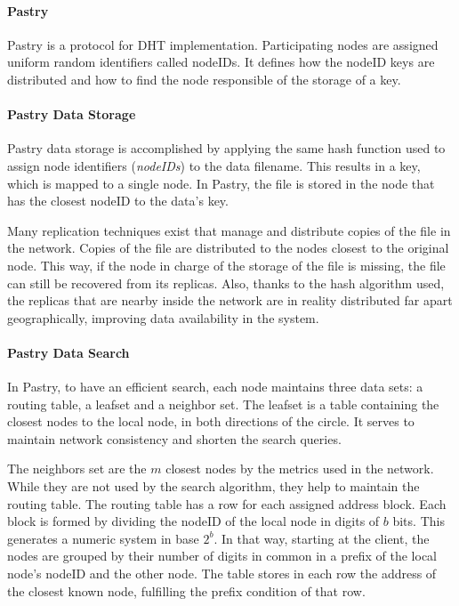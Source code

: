 \paragraph{Pastry}
\label{sec:pastry}
Pastry is a protocol for DHT implementation. Participating nodes are assigned
uniform random identifiers called nodeIDs. It defines how the nodeID keys 
are distributed and how to find the node responsible of the storage of a key.

\paragraph{Pastry Data Storage}

Pastry data storage is accomplished by applying the same hash function used to assign node
identifiers (\textit{nodeIDs}) to the data filename. This results in a key, which is
mapped to a single node. In Pastry, the file is stored in the node that has the closest nodeID
to the data's key.

Many replication techniques exist that manage and distribute copies of the file
in the network. 
Copies of the file are distributed to the nodes closest
to the original node. This way, if the node in charge of the storage of the file
is missing, the file can still be recovered from its replicas. Also, thanks
to the hash algorithm used, the replicas that are nearby inside the network are
in reality distributed far apart geographically, improving data availability
in the system.

\paragraph{Pastry Data Search}

In Pastry, to have an efficient search, each node maintains three data sets:
a routing table, a leafset and a neighbor set.
The leafset is a table containing the closest nodes to the local node, in both
directions of the circle. It serves to maintain network consistency and
shorten the search queries.

The neighbors set are the $m$ closest nodes by the metrics used in the network.
While they are not used by the search algorithm, they help to maintain the
routing table.
The routing table has a row for each assigned address block.
Each block is formed by dividing the nodeID of the local node in digits of $b$ bits. This
generates a numeric system in base $2^b$. In that way, starting at the client,
the nodes are grouped by their number of digits in common in a prefix of the
local node's nodeID and the other node. The table stores in each row the
address of the closest known node, fulfilling the prefix condition of that row.

